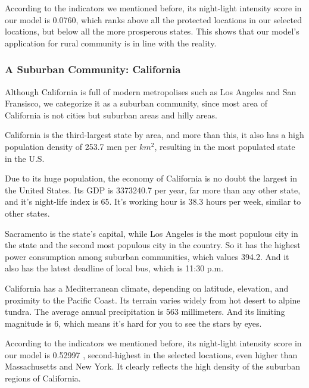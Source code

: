 According to the indicators we mentioned before, its night-light intensity score in our model is 0.0760, which ranks above all the protected locations in our selected locations, but below all the more prosperous states. This shows that our model's application for rural community is in line with the reality.

\subsubsection{A Suburban Community: California}
Although California is full of modern metropolises such as Los Angeles and San Fransisco, we categorize it as a suburban community, since most area of California is not cities but suburban areas and hilly areas.

California is the third-largest state by area, and more than this, it also has a high population density of 253.7 men per $km^2$, resulting in the most populated state in the U.S.

Due to its huge population, the economy of California is no doubt the largest in the United States. Its GDP is 3373240.7 per year, far more than any other state, and it's night-life index is 65. It's working hour is 38.3 hours per week, similar to other states.

Sacramento is the state's capital, while Los Angeles is the most populous city in the state and the second most populous city in the country. So it has the highest power consumption among suburban communities, which values 394.2. And it also has the latest deadline of local bus, which is 11:30 p.m.

California has a Mediterranean climate, depending on latitude, elevation, and proximity to the Pacific Coast. Its terrain varies widely from hot desert to alpine tundra. The average annual precipitation is 563 millimeters. And its limiting magnitude is 6, which means it's hard for you to see the stars by eyes.

According to the indicators we mentioned before, its night-light intensity score in our model is 0.52997
, second-highest in the selected locations, even higher than Massachusetts and New York. It clearly reflects the high density of the suburban regions of California.

